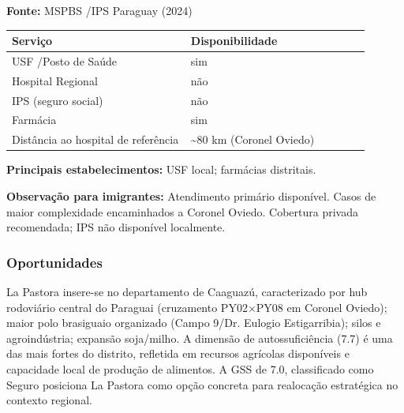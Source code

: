 \textbf{Fonte:} MSPBS /\allowbreak  IPS Paraguay (2024)

{\def\LTcaptype{none} %
\begin{longtable}{@{}>{\raggedright\arraybackslash}p{0.45\linewidth} >{\raggedright\arraybackslash}p{0.45\linewidth}@{}}
\toprule\noalign{}
Serviço & Disponibilidade \\
\midrule\noalign{}
\endhead
\bottomrule\noalign{}
\endlastfoot
USF /\allowbreak  Posto de Saúde & sim \\
Hospital Regional & não \\
IPS (seguro social) & não \\
Farmácia & sim \\
Distância ao hospital de referência & \textasciitilde80 km (Coronel
Oviedo) \\
\end{longtable}
}

\textbf{Principais estabelecimentos:} USF local; farmácias distritais.

\textbf{Observação para imigrantes:} Atendimento primário disponível.
Casos de maior complexidade encaminhados a Coronel Oviedo. Cobertura
privada recomendada; IPS não disponível localmente.
\newpage

\subsubsection*{Oportunidades}\label{oport-la-pastora-0517}
La Pastora insere-se no departamento de Caaguazú, caracterizado por hub rodoviário central do Paraguai (cruzamento PY02×PY08 em Coronel Oviedo); maior polo brasiguaio organizado (Campo 9/Dr. Eulogio Estigarribia); silos e agroindústria; expansão soja/milho. A dimensão de autossuficiência (7.7) é uma das mais fortes do distrito, refletida em recursos agrícolas disponíveis e capacidade local de produção de alimentos. A GSS de 7.0, classificado como Seguro posiciona La Pastora como opção concreta para realocação estratégica no contexto regional.


